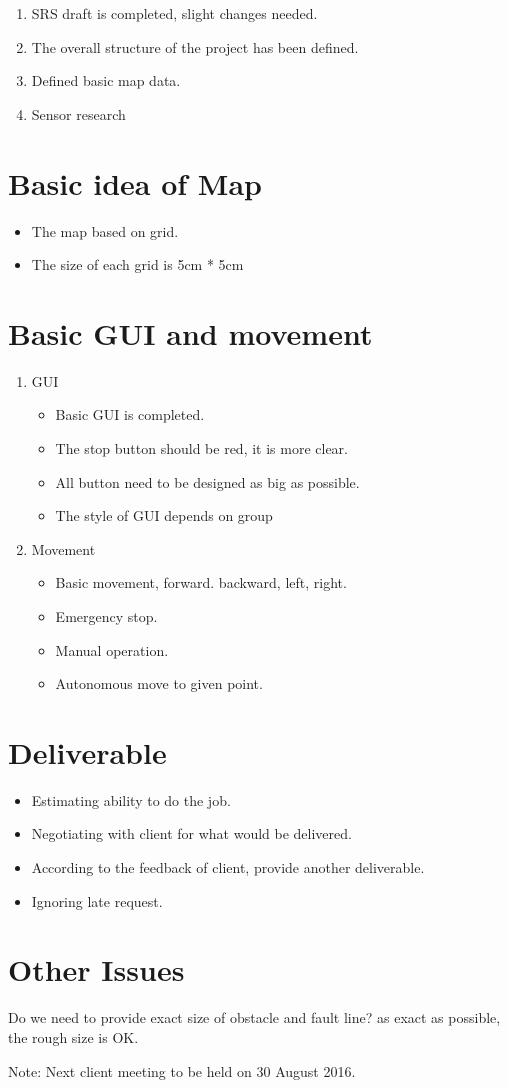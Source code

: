 \documentclass[11pt, a4paper]{article}
\begin{document}
\begin{enumerate}
\item SRS draft is completed, slight changes needed.
\item The overall structure of the project has been defined.
\item Defined basic map data.
\item Sensor research
\end{enumerate}

\section{Basic idea of Map}

\begin{itemize}
\item The map based on grid.
\item The size of each grid is 5cm * 5cm
\end{itemize}

\section{Basic GUI and movement}
\begin{enumerate}
\item GUI
\begin{itemize}
\item Basic GUI is completed.
\item The stop button should be red, it is more clear.
\item All button need to be designed as big as possible.
\item The style of GUI depends on group
\end{itemize}

\item Movement
\begin{itemize}
\item Basic movement, forward. backward, left, right.
\item Emergency stop.
\item Manual operation.
\item Autonomous move to given point.
\end{itemize}
\end{enumerate}

\section{Deliverable}
\begin{itemize}
\item Estimating ability to do the job.
\item Negotiating with client for what would be delivered.
\item According to the feedback of client, provide another deliverable.
\item Ignoring late request.
\end{itemize}



\section{Other Issues}
Do we need to provide exact size of obstacle and fault line?
as exact as possible, the rough size is OK.

\vspace*{10pt}
\noindent Note: Next client meeting to be held on 30 August 2016.
\end{document}
